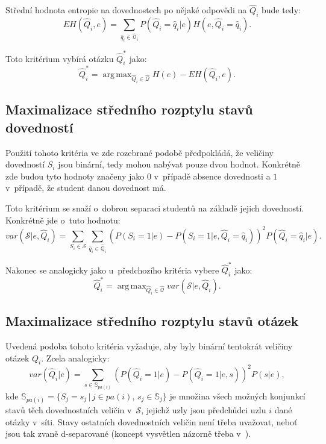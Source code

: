 \documentclass[a4paper,twoside,12pt]{scrbook}
\DeclareMathOperator*{\argmax}{arg\,max}
\begin{document}
Střední hodnota entropie na dovednostech po nějaké odpovědi na $\widehat{Q}_i$ bude tedy:
\begin{equation}
	EH(\widehat{Q}_i,e) = \sum_{\widehat{q}_i \in \widehat{\mathbb{\mathcal{Q}}}_i}P(\widehat{Q}_i = \widehat{q}_i|e) H(e, \widehat{Q}_i = \widehat{q}_i).
\end{equation}

Toto kritérium vybírá otázku $\widehat{Q}^*_i$ jako:
\begin{equation}
	\widehat{Q}^*_i = \argmax_{\widehat{Q}_i \in \widehat{\mathcal{Q}}} H(e) - EH(\widehat{Q}_i,e).
\end{equation}

\subsection{Maximalizace středního rozptylu stavů dovedností}
Použití tohoto kritéria ve zde rozebrané podobě předpokládá, že veličiny dovedností $S_i$ jsou binární, tedy mohou nabývat pouze dvou hodnot. Konkrétně zde budou tyto hodnoty značeny jako $0$ v~případě absence dovednosti a $1$ v~případě, že student danou dovednost má.

Toto kritérium se snaží o~dobrou separaci studentů na základě jejich dovedností. Konkrétně jde o~tuto hodnotu:
\begin{equation}
	var(\mathcal{S}|e, \widehat{Q}_i) = \sum_{S_i \in \mathcal{S}}\sum_{\widehat{q}_i \in \widehat{\mathbb{Q}}_i} \left(P(S_i=1|e) - P(S_i=1|e, \widehat{Q}_i = \widehat{q}_i) \right)^2 P(\widehat{Q}_i = \widehat{q}_i|e).
\end{equation}

Nakonec se analogicky jako u~předchozího kritéria vybere $\widehat{Q}^*_i$ jako:
\begin{equation}
	\widehat{Q}^*_i = \argmax_{\widehat{Q}_i \in \widehat{\mathcal{Q}}} var(\mathcal{S}|e, \widehat{Q}_i).
\end{equation}

\subsection{Maximalizace středního rozptylu stavů otázek}
Uvedená podoba tohoto kritéria vyžaduje, aby byly binární tentokrát veličiny otázek $Q_i$. Zcela analogicky:
\begin{equation}
	var(\widehat{Q}_i|e) = \sum_{s \in \mathbb{S}_{pa(i)}} \left(P(\widehat{Q}_i=1|e) - P(\widehat{Q}_i=1|e, s) \right)^2 P(s|e),
\end{equation}
kde $\mathbb{S}_{pa(i)}=\{S_j=s_j\,|\,j\in pa(i),\, s_j\in\mathbb{S}_j\}$ je množina všech možných konjunkcí stavů těch dovednostních veličin v~$\mathcal{S}$, jejichž uzly jsou předchůdci uzlu $i$ dané otázky v~síti. Stavy ostatních dovednostních veličin není třeba uvažovat, neboť jsou tak zvaně d-separované (koncept vysvětlen názorně třeba v~\cite[strana 26 až 32]{Jensenc2007}).
\end{document}
